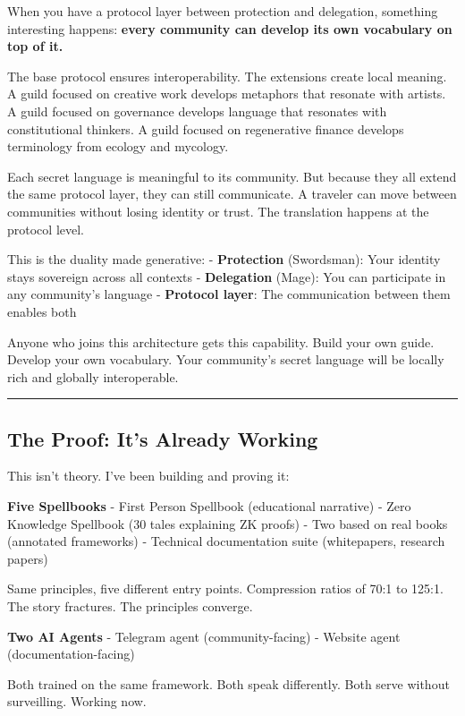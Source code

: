 \documentclass[
]{article}
\begin{document}
When you have a protocol layer between protection and delegation,
something interesting happens: \textbf{every community can develop its
own vocabulary on top of it.}

The base protocol ensures interoperability. The extensions create local
meaning. A guild focused on creative work develops metaphors that
resonate with artists. A guild focused on governance develops language
that resonates with constitutional thinkers. A guild focused on
regenerative finance develops terminology from ecology and mycology.

Each secret language is meaningful to its community. But because they
all extend the same protocol layer, they can still communicate. A
traveler can move between communities without losing identity or trust.
The translation happens at the protocol level.

This is the duality made generative: - \textbf{Protection} (Swordsman):
Your identity stays sovereign across all contexts - \textbf{Delegation}
(Mage): You can participate in any community's language -
\textbf{Protocol layer}: The communication between them enables both

Anyone who joins this architecture gets this capability. Build your own
guide. Develop your own vocabulary. Your community's secret language
will be locally rich and globally interoperable.

\begin{center}\rule{0.5\linewidth}{0.5pt}\end{center}

\subsection{The Proof: It's Already
Working}\label{the-proof-its-already-working}

This isn't theory. I've been building and proving it:

\textbf{Five Spellbooks} - First Person Spellbook (educational
narrative) - Zero Knowledge Spellbook (30 tales explaining ZK proofs) -
Two based on real books (annotated frameworks) - Technical documentation
suite (whitepapers, research papers)

Same principles, five different entry points. Compression ratios of 70:1
to 125:1. The story fractures. The principles converge.

\textbf{Two AI Agents} - Telegram agent (community-facing) - Website
agent (documentation-facing)

Both trained on the same framework. Both speak differently. Both serve
without surveilling. Working now.
\end{document}
